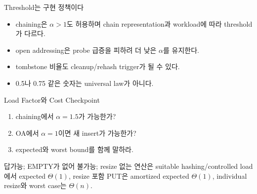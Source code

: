 \begin{frame}{Threshold는 구현 정책이다}
\begin{itemize}
\item chaining은 $\alpha>1$도 허용하며 chain representation과 workload에 따라 threshold가 다르다.
\item open addressing은 probe 급증을 피하려 더 낮은 $\alpha$를 유지한다.
\item tombstone 비율도 cleanup/rehash trigger가 될 수 있다.
\item 0.5나 0.75 같은 숫자는 universal law가 아니다.
\end{itemize}
\end{frame}
\begin{frame}{Load Factor와 Cost Checkpoint}
\begin{enumerate}\item chaining에서 $\alpha=1.5$가 가능한가?\item OA에서 $\alpha=1$이면 새 insert가 가능한가?\item expected와 worst bound를 함께 말하라.\end{enumerate}
\begin{exampleblock}{답}가능; EMPTY가 없어 불가능; resize 없는 연산은 suitable hashing/controlled load에서 expected $\Theta(1)$, resize 포함 PUT은 amortized expected $\Theta(1)$, individual resize와 worst case는 $\Theta(n)$.\end{exampleblock}
\end{frame}
